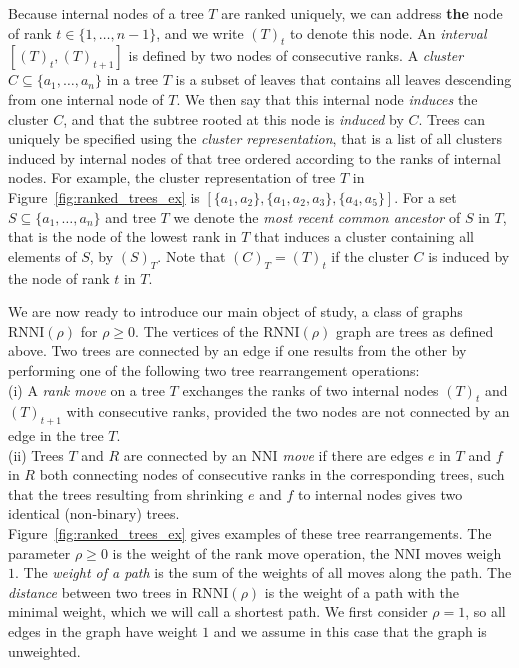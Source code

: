 \documentclass[11pt]{amsart}
\newcommand{\rnni}{\mathrm{RNNI}}
\newcommand{\nni}{\mathrm{NNI}}
\newcommand{\summary}[1]{} %
\begin{document}
Because internal nodes of a tree $T$ are ranked uniquely, we can address \textbf{the} node of rank ${t \in \{1, \ldots, n - 1\}}$, and we write $(T)_t$ to denote this node.
An \emph{interval} $[(T)_t,(T)_{t+1}]$ is defined by two nodes of consecutive ranks.
A \emph{cluster} $C \subseteq \{a_1, \ldots, a_n\}$ in a tree $T$ is a subset of leaves that contains all leaves descending from one internal node of $T$.
We then say that this internal node \emph{induces} the cluster $C$, and that the subtree rooted at this node is \emph{induced} by $C$.
Trees can uniquely be specified using the \emph{cluster representation}, that is a list of all clusters induced by internal nodes of that tree ordered according to the ranks of internal nodes.
For example, the cluster representation of tree $T$ in Figure~\ref{fig:ranked_trees_ex} is $[\{a_1, a_2\}, \{a_1, a_2, a_3\}, \{a_4, a_5\}]$.
For a set $S \subseteq \{a_1, \ldots, a_n\}$ and tree $T$ we denote the \emph{most recent common ancestor} of $S$ in $T$, that is the node of the lowest rank in $T$ that induces a cluster containing all elements of $S$, by $(S)_T$.
Note that $(C)_T = (T)_t$ if the cluster $C$ is induced by the node of rank $t$ in $T$.

\summary{Defining graph $\rnni(\rho)$.}
We are now ready to introduce our main object of study, a class of graphs $\rnni(\rho)$ for $\rho \geq 0$.
The vertices of the $\rnni(\rho)$ graph are trees as defined above.
Two trees are connected by an edge if one results from the other by performing one of the following two tree rearrangement operations:\\
(i) A \emph{rank move} on a tree $T$ exchanges the ranks of two internal nodes $(T)_t$ and $(T)_{t+1}$ with consecutive ranks, provided the two nodes are not connected by an edge in the tree $T$.\\
(ii) Trees $T$ and $R$ are connected by an \emph{$\nni$ move} if there are edges $e$ in $T$ and $f$ in $R$ both connecting nodes of consecutive ranks in the corresponding trees, such that the trees resulting from shrinking $e$ and $f$ to internal nodes gives two identical (non-binary) trees.\\
Figure~\ref{fig:ranked_trees_ex} gives examples of these tree rearrangements.
The parameter $\rho \geq 0$ is the weight of the rank move operation, the $\nni$ moves weigh $1$.
The \emph{weight of a path} is the sum of the weights of all moves along the path.
The \emph{distance} between two trees in $\rnni(\rho)$ is the weight of a path with the minimal weight, which we will call a shortest path.
We first consider $\rho = 1$, so all edges in the graph have weight $1$ and we assume in this case that the graph is unweighted.
\end{document}
